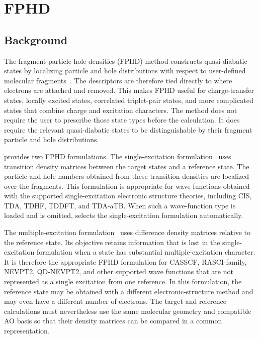 \section{FPHD}\label{sec-fphd}
\subsection{Background}
The fragment particle-hole densities (FPHD) method constructs quasi-diabatic states by localizing particle and hole distributions with respect to user-defined molecular fragments~\cite{Wang-JPCL-2021-1032,Wang-JCTC-2023-3900}. The descriptors are therefore tied directly to where electrons are attached and removed. This makes FPHD useful for charge-transfer states, locally excited states, correlated triplet-pair states, and more complicated states that combine charge and excitation characters. The method does not require the user to prescribe those state types before the calculation. It does require the relevant quasi-diabatic states to be distinguishable by their fragment particle and hole distributions.

\progname{} provides two FPHD formulations. The single-excitation formulation~\cite{Wang-JPCL-2021-1032} uses transition density matrices between the target states and a reference state. The particle and hole numbers obtained from these transition densities are localized over the fragments. This formulation is appropriate for wave functions obtained with the supported single-excitation electronic structure theories, including CIS, TDA, TDHF, TDDFT, and TDA-aTB. When such a wave-function type is loaded and  is omitted, \progname{} selects the single-excitation formulation automatically.

The multiple-excitation formulation~\cite{Wang-JCTC-2023-3900} uses difference density matrices relative to the reference state. Its objective retains information that is lost in the single-excitation formulation when a state has substantial multiple-excitation character. It is therefore the appropriate FPHD formulation for CASSCF, RASCI-family, NEVPT2, QD-NEVPT2, and other supported wave functions that are not represented as a single excitation from one reference. In this formulation, the reference state may be obtained with a different electronic-structure method and may even have a different number of electrons. The target and reference calculations must nevertheless use the same molecular geometry and compatible AO basis so that their density matrices can be compared in a common representation.

